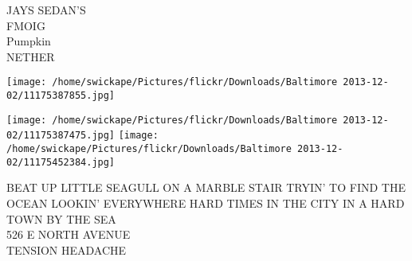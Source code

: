 \documentclass[10pt,letterpaper]{article}
\begin{document}
JAYS SEDAN'S\\
FMOIG\\
Pumpkin\\
NETHER\\
\pagebreak

\texttt{[image: /home/swickape/Pictures/flickr/Downloads/Baltimore 2013-12-02/11175387855.jpg]}

\vspace{0.25in}
\texttt{[image: /home/swickape/Pictures/flickr/Downloads/Baltimore 2013-12-02/11175387475.jpg]}
\texttt{[image: /home/swickape/Pictures/flickr/Downloads/Baltimore 2013-12-02/11175452384.jpg]}

BEAT UP LITTLE SEAGULL ON A MARBLE STAIR TRYIN' TO FIND THE OCEAN LOOKIN' EVERYWHERE HARD TIMES IN THE CITY IN A HARD TOWN BY THE SEA\\
526 E NORTH AVENUE\\
TENSION HEADACHE\\
\pagebreak
\end{document}
